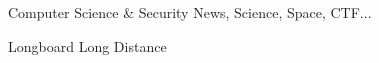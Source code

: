 

\begin{cventries}

  \begin{cvitems} %
    \item {Computer Science \& Security News, Science, Space, CTF...}
    \item {Longboard Long Distance}
  \end{cvitems}

\end{cventries}
